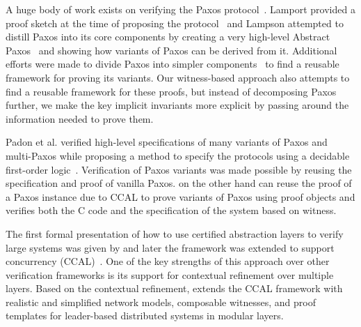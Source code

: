 A huge body of work exists on verifying the Paxos protocol~\cite{paxos}.
Lamport provided a proof sketch at the time of proposing the protocol~\cite{paxosmadesimple}
and Lampson attempted to distill Paxos into its core components by creating a very
high-level Abstract Paxos~\cite{Lampson2001} and showing how variants of
Paxos can be derived from it. Additional efforts were made to divide Paxos
into simpler components~\cite{dpaxos, sdpaxos} to find a reusable framework for
proving its variants. Our witness-based approach also attempts
to find a reusable framework for these proofs, but instead of decomposing Paxos
further, we make the key implicit invariants more explicit by passing around
the information needed to prove them.

Padon et al. verified high-level specifications of many variants of Paxos
and multi-Paxos while proposing a method to specify the protocols using
a decidable first-order logic~\cite{paxosepr}. Verification of Paxos
variants was made possible by reusing the specification and proof of vanilla
Paxos. \sysname{} on the other hand can reuse the proof of a Paxos instance
due to CCAL to prove variants of Paxos using proof objects and verifies both the
C code and the specification of the system based on witness.
\vspace{-0.2em}

The first formal presentation of how to use certified abstraction layers to
verify large systems was given by \citet{deepspec} and later the framework was
extended to support concurrency (CCAL)~\cite{concurrency}.
One of the key strengths of this approach over other verification frameworks
is its support for contextual refinement over multiple layers.
Based on the contextual refinement, \sysname{} extends the CCAL framework with
realistic and simplified network models, composable witnesses,
and proof templates for leader-based distributed systems in modular layers.





